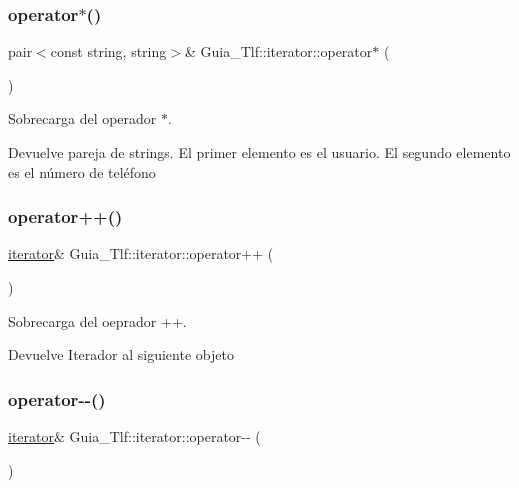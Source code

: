 \subsubsection{\texorpdfstring{operator$\ast$()}{operator*()}}
{\footnotesize\ttfamily pair$<$const string, string$>$\& Guia\+\_\+\+Tlf\+::iterator\+::operator$\ast$ (\begin{DoxyParamCaption}{ }\end{DoxyParamCaption})}



Sobrecarga del operador $\ast$. 

\begin{DoxyReturn}{Devuelve}
pareja de strings. El primer elemento es el usuario. El segundo elemento es el número de teléfono 
\end{DoxyReturn}
\mbox{\label{classGuia__Tlf_1_1iterator_a4edb22003e51ce05bb2be0e0f0f9334d}} 
\subsubsection{\texorpdfstring{operator++()}{operator++()}}
{\footnotesize\ttfamily \hyperlink{classGuia__Tlf_1_1iterator}{iterator}\& Guia\+\_\+\+Tlf\+::iterator\+::operator++ (\begin{DoxyParamCaption}{ }\end{DoxyParamCaption})}



Sobrecarga del oeprador ++. 

\begin{DoxyReturn}{Devuelve}
Iterador al siguiente objeto 
\end{DoxyReturn}
\mbox{\label{classGuia__Tlf_1_1iterator_a40654c62e5d7fa0c88f41cc8248cba44}} 
\subsubsection{\texorpdfstring{operator-\/-\/()}{operator--()}}
{\footnotesize\ttfamily \hyperlink{classGuia__Tlf_1_1iterator}{iterator}\& Guia\+\_\+\+Tlf\+::iterator\+::operator-\/-\/ (\begin{DoxyParamCaption}{ }\end{DoxyParamCaption})}



